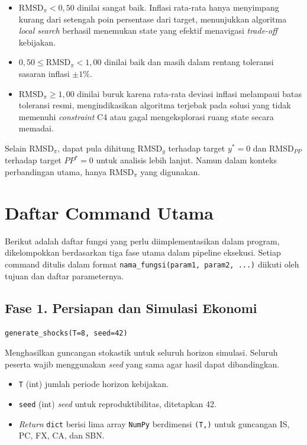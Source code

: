 \begin{itemize}
    \item $\text{RMSD}_{\pi} < 0{,}50$ dinilai sangat baik. Inflasi rata-rata hanya menyimpang kurang dari setengah poin persentase dari target, menunjukkan algoritma \textit{local search} berhasil menemukan state yang efektif menavigasi \textit{trade-off} kebijakan.
    \item $0{,}50 \leq \text{RMSD}_{\pi} < 1{,}00$ dinilai baik dan masih dalam rentang toleransi sasaran inflasi $\pm 1\%$.
    \item $\text{RMSD}_{\pi} \geq 1{,}00$ dinilai buruk karena rata-rata deviasi inflasi melampaui batas toleransi resmi, mengindikasikan algoritma terjebak pada solusi yang tidak memenuhi \textit{constraint} C4 atau gagal mengeksplorasi ruang state secara memadai.
\end{itemize}

Selain RMSD$_{\pi}$, dapat pula dihitung RMSD$_{y}$ terhadap target $y^{*} = 0$ dan RMSD$_{PP}$ terhadap target $PP^{*} = 0$ untuk analisis lebih lanjut. Namun dalam konteks perbandingan utama, hanya RMSD$_{\pi}$ yang digunakan.

\section{Daftar Command Utama}

Berikut adalah daftar fungsi yang perlu diimplementasikan dalam program, dikelompokkan berdasarkan tiga fase utama dalam pipeline eksekusi. Setiap command ditulis dalam format \texttt{nama\_fungsi(param1, param2, ...)} diikuti oleh tujuan dan daftar parameternya.

\subsection*{Fase 1. Persiapan dan Simulasi Ekonomi}

\texttt{generate\_shocks(T=8, seed=42)}

Menghasilkan guncangan stokastik untuk seluruh horizon simulasi. Seluruh peserta wajib menggunakan \textit{seed} yang sama agar hasil dapat dibandingkan.

\begin{itemize}
    \item \texttt{T} (int) jumlah periode horizon kebijakan.
    \item \texttt{seed} (int) \textit{seed} untuk reproduktibilitas, ditetapkan 42.
    \item \textit{Return} \texttt{dict} berisi lima array \texttt{NumPy} berdimensi \texttt{(T,)} untuk guncangan IS, PC, FX, CA, dan SBN.
\end{itemize}

